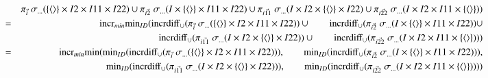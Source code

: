 \begin{eqnarray*}
&& \pi_{\vec{i}} \;\sigma_{\dots}(  \{{\langle\rangle} \} \times I2 \times I11 \times I22) \cup 
\pi_{\vec{i2}} \;\sigma_{\dots}(I \times \{{\langle\rangle} \} \times I11 \times I22) \cup 
\pi_{\vec{i11}} \;\sigma_{\dots}(I \times  I2 \times  \{{\langle\rangle} \} \times I22) \cup 
\pi_{\vec{i22}} \;\sigma_{ \dots}(I \times I2 \times I11 \times \{{\langle\rangle} \} ) )\\
&=& \mathrm{incr}_{min} \mathrm{min}_{ID} ( \mathrm{incrdiff}_{\cup} (\pi_{\vec{i}} \;\sigma_{\dots}(  \{{\langle\rangle} \} \times I2 \times I11 \times I22)) \cup 
\qquad\mathrm{incrdiff}_{\cup} (\pi_{\vec{i2}} \;\sigma_{\dots}(I \times \{{\langle\rangle} \} \times I11 \times I22)) \cup 
\\&&\qquad\mathrm{incrdiff}_{\cup} (\pi_{\vec{i11}} \;\sigma_{\dots}(I \times  I2 \times  \{{\langle\rangle} \} \times I22)) \cup 
\qquad\mathrm{incrdiff}_{\cup} (\pi_{\vec{i22}} \;\sigma_{ \dots}(I \times I2 \times I11 \times \{{\langle\rangle} \} )))\\
&=& \mathrm{incr}_{min} \mathrm{min} (\mathrm{min}_{ID} (\mathrm{incrdiff}_{\cup} (\pi_{\vec{i}} \;\sigma_{\dots}(  \{{\langle\rangle} \} \times I2 \times I11 \times I22))) , 
\qquad\mathrm{min}_{ID}(\mathrm{incrdiff}_{\cup} (\pi_{\vec{i2}} \;\sigma_{\dots}(I \times \{{\langle\rangle} \} \times I11 \times I22))) ,
\\&&\qquad\mathrm{min}_{ID}(\mathrm{incrdiff}_{\cup} (\pi_{\vec{i11}} \;\sigma_{\dots}(I \times  I2 \times  \{{\langle\rangle} \} \times I22))) , 
\qquad\mathrm{min}_{ID}(\mathrm{incrdiff}_{\cup} (\pi_{\vec{i22}} \;\sigma_{ \dots}(I \times I2 \times I11 \times \{{\langle\rangle} \} ))))
\end{eqnarray*}

